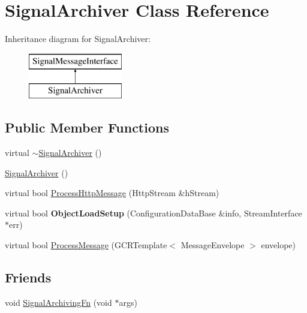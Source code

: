 \hypertarget{classSignalArchiver}{
\section{SignalArchiver Class Reference}
\label{classSignalArchiver}
}
Inheritance diagram for SignalArchiver:\begin{figure}[H]
\begin{center}
\leavevmode
\includegraphics[height=2.000000cm]{classSignalArchiver}
\end{center}
\end{figure}
\subsection*{Public Member Functions}
\begin{DoxyCompactItemize}
\item 
virtual \hyperlink{classSignalArchiver_a68e2febb702e5ef39599b2e4a7934169}{$\sim$SignalArchiver} ()
\item 
\hyperlink{classSignalArchiver_adf6593128ebb50107f6861096702cc35}{SignalArchiver} ()
\item 
virtual bool \hyperlink{classSignalArchiver_a149116390dd9f9e511c4704480a48352}{ProcessHttpMessage} (HttpStream \&hStream)
\item 
\hypertarget{classSignalArchiver_a6b33d4d213c862228a60140de0d72a30}{
virtual bool {\bfseries ObjectLoadSetup} (ConfigurationDataBase \&info, StreamInterface $\ast$err)}
\label{classSignalArchiver_a6b33d4d213c862228a60140de0d72a30}

\item 
virtual bool \hyperlink{classSignalArchiver_a09622d82d9e4a388bd26d75353a10d98}{ProcessMessage} (GCRTemplate$<$ MessageEnvelope $>$ envelope)
\end{DoxyCompactItemize}
\subsection*{Friends}
\begin{DoxyCompactItemize}
\item 
void \hyperlink{classSignalArchiver_ab48b650b85581a0ea28f252b1650bf8b}{SignalArchivingFn} (void $\ast$args)
\end{DoxyCompactItemize}


